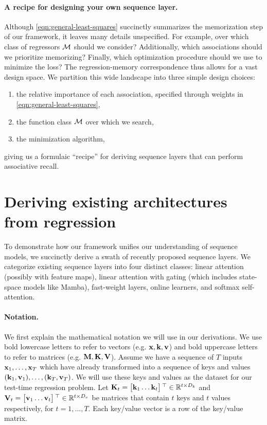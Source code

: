 \documentclass[notitlepage, 11pt]{article}
\newcommand*{\dkey}{{D_k}}
\newcommand*{\dval}{{D_v}}
\begin{document}
\paragraph{A recipe for designing your own sequence layer.}
Although \autoref{eqn:general-least-squares} succinctly summarizes the memorization step of our framework, it leaves many details unspecified.
For example, over which class of regressors $\mathcal{M}$ should we consider?
Additionally, which associations should we prioritize memorizing?
Finally, which optimization procedure should we use to minimize the loss?
The regression-memory correspondence thus allows for a vast design space.
We partition this wide landscape into three simple design choices:
\begin{enumerate}
    \item the relative importance of each association, specified through weights in  \autoref{eqn:general-least-squares},
    \item the function class $\mathcal{M}$ over which we search,
    \item the minimization algorithm,
\end{enumerate}
giving us a formulaic ``recipe'' for deriving sequence layers that can perform associative recall.

\section{Deriving existing architectures from regression}\label{sec:deriving-architectures}

To demonstrate how our framework unifies our understanding of sequence models, we succinctly derive a swath of recently proposed sequence layers.
We categorize existing sequence layers into four distinct classes: linear attention (possibly with feature maps), linear attention with gating (which includes state-space models like Mamba), fast-weight layers, online learners, and softmax self-attention.

\paragraph{Notation.}
We first explain the mathematical notation we will use in our derivations.
We use bold lowercase letters to refer to vectors (e.g. $\mathbf{x}, \mathbf{k}, \mathbf{v}$) and bold uppercase letters to refer to matrices (e.g. $\mathbf{M}, \mathbf{K}, \mathbf{V}$).
Assume we have a sequence of $T$ inputs $\mathbf{x}_1, \ldots, \mathbf{x}_T$ which have already transformed into a sequence of keys and values $(\mathbf{k}_1, \mathbf{v}_1), \ldots, (\mathbf{k}_T, \mathbf{v}_T)$.
We will use these keys and values as the dataset for our test-time regression problem.
Let $\Kbf_t = \bmat{\kbf_1 \ldots \kbf_t}\transpose \in \reals^{t\times \dkey}$ and $\Vbf_t = \bmat{\vbf_1 \ldots \vbf_t}\transpose \in \reals^{t\times \dval}$ be matrices that contain $t$ keys and $t$ values respectively, for $t=1, \ldots, T$.
Each key/value vector is a row of the key/value matrix.
\end{document}
